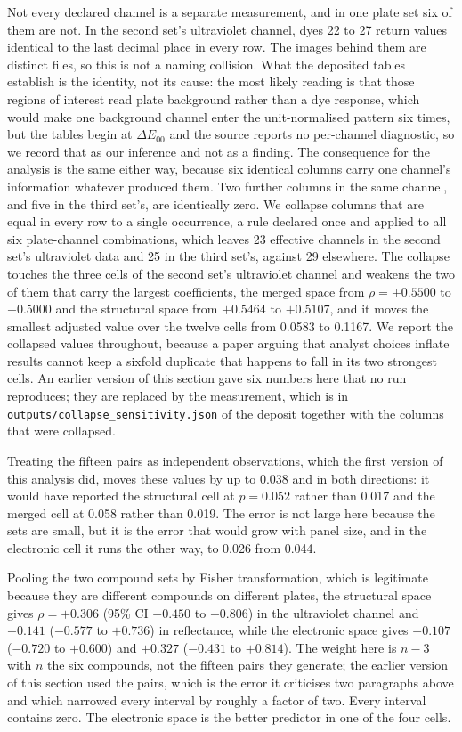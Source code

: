 \documentclass[journal=jacsat,manuscript=suppinfo,margin=1in]{achemso}
\begin{document}
Not every declared channel is a separate measurement, and in one plate set six of
them are not. In the second set's ultraviolet channel, dyes 22 to 27 return
values identical to the last decimal place in every row. The images behind them
are distinct files, so this is not a naming collision. What the deposited
tables establish is the identity, not its cause: the most likely reading is
that those regions of interest read plate background rather than a dye
response, which would make one background channel enter the unit-normalised
pattern six times, but the tables begin at $\Delta E_{00}$ and the source
reports no per-channel diagnostic, so we record that as our inference and not
as a finding. The consequence for the analysis is the same either way, because
six identical columns carry one channel's information whatever produced them. Two further columns in the same channel, and five
in the third set's, are identically zero. We collapse columns that are equal in
every row to a single occurrence, a rule declared once and applied to all six
plate-channel combinations, which leaves 23 effective channels in the second
set's ultraviolet data and 25 in the third set's, against 29 elsewhere. The collapse
touches the three cells of the second set's ultraviolet channel and weakens the
two of them that carry the largest coefficients, the merged space from
$\rho = +0.5500$ to $+0.5000$ and the structural space from $+0.5464$ to
$+0.5107$, and it moves the smallest adjusted value over the twelve cells from
0.0583 to 0.1167. We report the collapsed values throughout, because a paper
arguing that analyst choices inflate results cannot keep a sixfold duplicate
that happens to fall in its two strongest cells. An earlier version of this
section gave six numbers here that no run reproduces; they are replaced by the
measurement, which is in \texttt{outputs/collapse\_sensitivity.json} of the
deposit together with the columns that were collapsed.

Treating the fifteen pairs as independent observations, which the first version
of this analysis did, moves these values by up to 0.038 and in both directions:
it would have reported the structural cell at $p = 0.052$ rather than 0.017 and
the merged cell at 0.058 rather than 0.019. The error is not large here
because the sets are small, but it is the error that would grow with panel size,
and in the electronic cell it runs the other way, to 0.026 from 0.044.

Pooling the two compound sets by Fisher transformation, which is legitimate
because they are different compounds on different plates, the structural space
gives $\rho = +0.306$ (95\% CI $-0.450$ to $+0.806$) in the ultraviolet channel
and $+0.141$ ($-0.577$ to $+0.736$) in reflectance, while the electronic space
gives $-0.107$ ($-0.720$ to $+0.600$) and $+0.327$ ($-0.431$ to $+0.814$). The
weight here is $n-3$ with $n$ the six compounds, not the fifteen pairs they
generate; the earlier version of this section used the pairs, which is the error
it criticises two paragraphs above and which narrowed every interval by roughly
a factor of two. Every interval contains zero. The electronic space is the
better predictor in one of the four cells.
\end{document}
